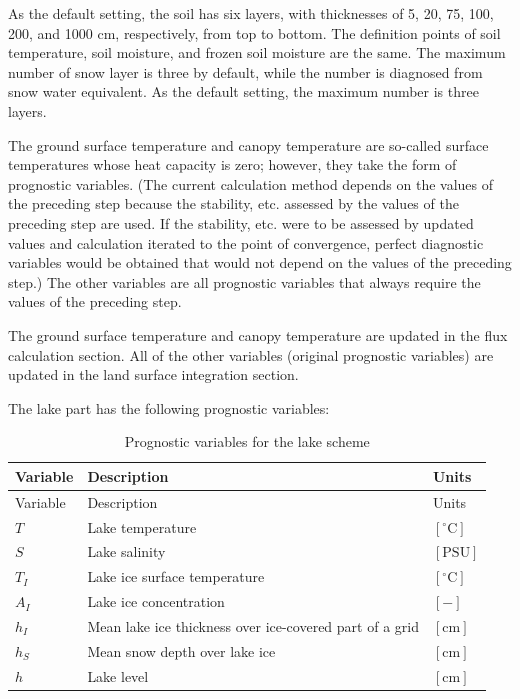 As the default setting, the soil has six layers, with thicknesses of 5, 20, 75, 100, 200, and 1000 cm, respectively, from top to bottom. The definition points of soil temperature, soil moisture, and
frozen soil moisture are the same. The maximum number of snow layer is three by default, while the number is diagnosed from snow water equivalent. As the default setting, the maximum number is three
layers.

The ground surface temperature and canopy temperature are so-called surface temperatures whose heat capacity is zero; however, they take the form of prognostic variables. (The current calculation
method depends on the values of the preceding step because the stability, etc. assessed by the values of the preceding step are used. If the stability, etc. were to be assessed by updated values and
calculation iterated to the point of convergence, perfect diagnostic variables would be obtained that would not depend on the values of the preceding step.) The other variables are all prognostic
variables that always require the values of the preceding step.

The ground surface temperature and canopy temperature are updated in the flux calculation section. All of the other variables (original prognostic variables) are updated in the land surface
integration section.

The lake part has the following prognostic variables:

\begin{longtable}[]{@{}lll@{}}
\caption{Prognostic variables for the lake scheme}\tabularnewline
\toprule\noalign{}
Variable & Description & Units \\
\midrule\noalign{}
\endfirsthead
\toprule\noalign{}
Variable & Description & Units \\
\midrule\noalign{}
\endhead
\bottomrule\noalign{}
\endlastfoot
\(T\) & Lake temperature & \(\mathrm{[^{\circ}C]}\) \\
\(S\) & Lake salinity & \(\mathrm{[PSU]}\) \\
\(T_I\) & Lake ice surface temperature & \(\mathrm{[^{\circ}C]}\) \\
\(A_I\) & Lake ice concentration & \(\mathrm{[-]}\) \\
\(h_I\) & Mean lake ice thickness over ice-covered part of a grid & \(\mathrm{[cm]}\) \\
\(h_S\) & Mean snow depth over lake ice & \(\mathrm{[cm]}\) \\
\(h\) & Lake level & \(\mathrm{[cm]}\) \\
\end{longtable}

